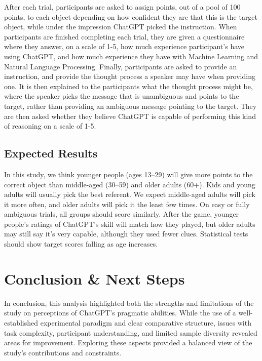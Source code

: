 \documentclass[12pt]{article}
\begin{document}
After each trial, participants are asked to assign points, out of a pool of 100 points, to each object depending on how confident they are that this is the target object, while under the impression ChatGPT picked the instruction. When participants are finished completing each trial, they are given a questionnaire where they answer, on a scale of 1-5, how much experience participant’s have using ChatGPT, and how much experience they have with Machine Learning and Natural Language Processing. Finally, participants are asked to provide an instruction, and provide the thought process a speaker may have when providing one. It is then explained to the participants what the thought process might be, where the speaker picks the message that is unambiguous and points to the target, rather than providing an ambiguous message pointing to the target. They are then asked whether they believe ChatGPT is capable of performing this kind of reasoning on a scale of 1-5.


\subsection{Expected Results}
In this study, we think younger people (ages 13–29) will give more points to the correct object than middle-aged (30–59) and older adults (60+). Kids and young adults will usually pick the best referent. We expect middle-aged adults will pick it more often, and older adults will pick it the least few times. On easy or fully ambiguous trials, all groups should score similarly. After the game, younger people’s ratings of ChatGPT’s skill will match how they played, but older adults may still say it’s very capable, although they used fewer clues. Statistical tests should show target scores falling as age increases.

\section{Conclusion \& Next Steps}
In conclusion, this analysis highlighted both the strengths and limitations of the study on perceptions of ChatGPT’s pragmatic abilities. While the use of a well-established experimental paradigm and clear comparative structure, issues with task complexity, participant understanding, and limited sample diversity revealed areas for improvement. Exploring these aspects provided a balanced view of the study’s contributions and constraints.

 

\end{document}
